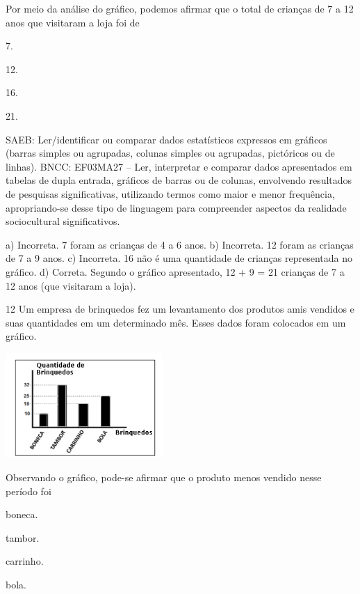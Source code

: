 {\begin{escolha}
{Por meio da análise do gráfico, podemos afirmar que o total de crianças de 7 a 12 anos que visitaram a loja foi de

\begin{escolha}

\item
  7.
\item
  12.
\item
  16.
\item
  21.
\end{escolha}

SAEB: Ler/identificar ou comparar dados estatísticos
expressos em gráficos (barras simples ou agrupadas, colunas simples ou agrupadas, pictóricos ou de linhas).
BNCC: EF03MA27 -- Ler, interpretar e comparar dados apresentados em tabelas de dupla entrada,
gráficos de barras ou de colunas, envolvendo resultados de pesquisas significativas, utilizando
termos como maior e menor frequência, apropriando-se desse tipo de linguagem para
compreender aspectos da realidade sociocultural significativos.

a) Incorreta. 7 foram as crianças de 4 a 6 anos.
b) Incorreta. 12 foram as crianças de 7 a 9 anos.
c) Incorreta. 16 não é uma quantidade de crianças representada no gráfico.
d) Correta. Segundo o gráfico apresentado, 12 + 9 = 21 crianças de 7 a 12 anos (que visitaram a loja).

\num{12} Um empresa de brinquedos fez um levantamento dos produtos amis vendidos e suas quantidades em um determinado mês. Esses dados foram colocados em um gráfico.


\includegraphics[width=2.35294in,height=1.56863in]{media/image137.png}

Observando o gráfico, pode-se afirmar que o produto menos vendido nesse período foi

\begin{escolha}

\item
  boneca.
\item
  tambor.
\item
  carrinho.
\item
  bola.
\end{escolha}

}
\end{escolha}}
